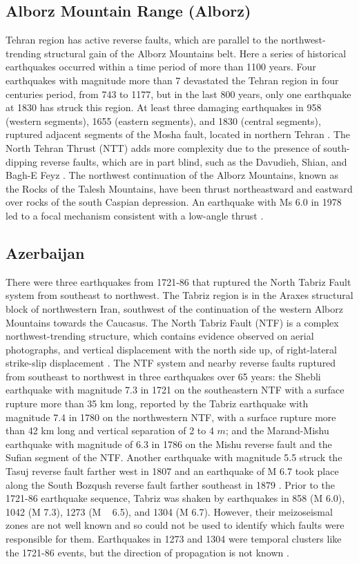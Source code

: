 \subsection{Alborz Mountain Range (Alborz)}
Tehran region has active reverse faults, which are parallel to the northwest-trending structural gain of the Alborz Mountains belt. Here a series of historical earthquakes occurred within a time period of more than 1100 years. Four earthquakes with magnitude more than 7 devastated the Tehran region in four centuries period, from 743 to 1177, but in the last 800 years, only one earthquake at 1830 has struck this region. At least three damaging earthquakes in 958 (western segments), 1655 (eastern segments), and 1830 (central segments), ruptured adjacent segments of the Mosha fault, located in northern Tehran \citep{Berberian1999}.
The North Tehran Thrust (NTT) adds more complexity due to the presence of south-dipping reverse faults, which are in part blind, such as the Davudieh, Shian, and Bagh-E Feyz \citep{Berberian1999}.
The northwest continuation of the Alborz Mountains, known as the Rocks of the Talesh Mountains, have been thrust northeastward and eastward over rocks of the south Caspian depression. An earthquake with Ms 6.0 in 1978 led to a focal mechanism consistent with a low-angle thrust \citep{Berberian1999}.



\subsection{Azerbaijan}
There were three earthquakes from 1721-86 that ruptured the North Tabriz Fault system from southeast to northwest. The Tabriz region is in the Araxes structural block of northwestern Iran, southwest of the continuation of the western Alborz Mountains towards the Caucasus. The North Tabriz Fault (NTF) is a complex northwest-trending structure, which contains evidence observed on aerial photographs, and vertical displacement with the north side up, of right-lateral strike-slip displacement \citep{Berberian1999}.
The NTF system and nearby reverse faults ruptured from southeast to northwest in three earthquakes over 65 years: the Shebli earthquake with magnitude 7.3 in 1721 on the southeastern NTF with a surface rupture more than 35 km long, reported by \citet{Jones1834} the Tabriz earthquake with magnitude 7.4 in 1780 on the northwestern NTF, with a surface rupture more than 42 km long and vertical separation of 2 to 4 $m$; and the Marand-Mishu earthquake with magnitude of 6.3 in 1786 on the Mishu reverse fault and the Sufian segment of the NTF. Another earthquake with  magnitude 5.5 struck the Tasuj reverse fault farther west in 1807 and an earthquake of M 6.7 took place along the South Bozqush reverse fault farther southeast in 1879 \citep{Berberian1999}.
Prior to the 1721-86 earthquake sequence, Tabriz was shaken by earthquakes in 858 (M 6.0), 1042 (M 7.3), 1273 (M ~ 6.5), and 1304 (M 6.7). However, their meizoseismal zones are not well known and so could not be used to identify which faults were responsible for them. Earthquakes in 1273 and 1304 were temporal clusters like the 1721-86 events, but the direction of propagation is not known \citep{Berberian1997, Berberian1999}.


